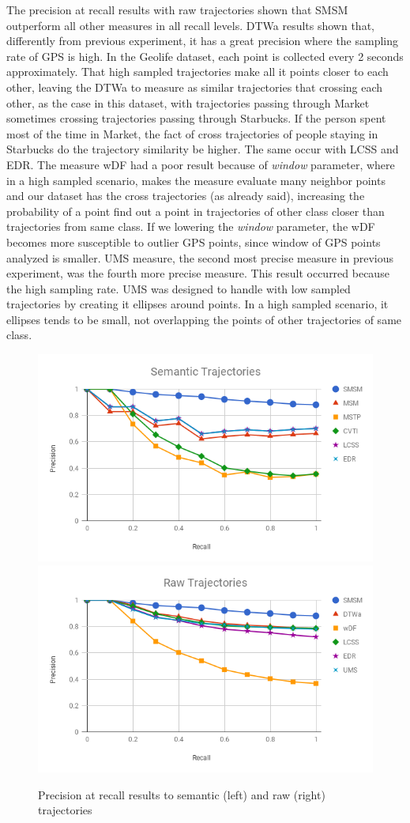\documentclass[12pt]{article}
\begin{document}
{The precision at recall results with raw trajectories shown that SMSM outperform all other measures in all recall levels. DTWa results shown that, differently from previous experiment, it has a great precision where the sampling rate of GPS is high. In the Geolife dataset, each point is collected every 2 seconds approximately. That high sampled trajectories make all it points closer to each other, leaving the DTWa to measure as similar trajectories that crossing each other, as the case in this dataset, with trajectories passing through Market sometimes crossing trajectories passing through Starbucks. If the person spent most of the time in Market, the fact of cross trajectories of people staying in Starbucks do the trajectory similarity be higher. The same occur with LCSS and EDR. The measure wDF had a poor result because of \emph{window} parameter, where in a high sampled scenario, makes the measure evaluate many neighbor points and our dataset has the cross trajectories (as already said), increasing the probability of a point find out a point in trajectories of other class closer than trajectories from same class. If we lowering the \emph{window} parameter, the wDF becomes more susceptible to outlier GPS points, since window of GPS points analyzed is smaller. UMS measure, the second most precise measure in previous experiment, was the fourth more precise measure. This result occurred because the high sampling rate. UMS was designed to handle with low sampled trajectories by creating it ellipses around points. In a high sampled scenario, it ellipses tends to be small, not overlapping the points of other trajectories of same class.}

\begin{figure}[ht!]
\centerline{
\centering
\includegraphics[width=.55\textwidth]{Images/P_R-chart_Geolife.png}
\includegraphics[width=.55\textwidth]{Images/P_R-chart_Geolife-raw.png}
}
\caption{Precision at recall results to semantic (left) and raw (right) trajectories}
\label{fig:geolife_precision_recall}
\end{figure}
\end{document}

